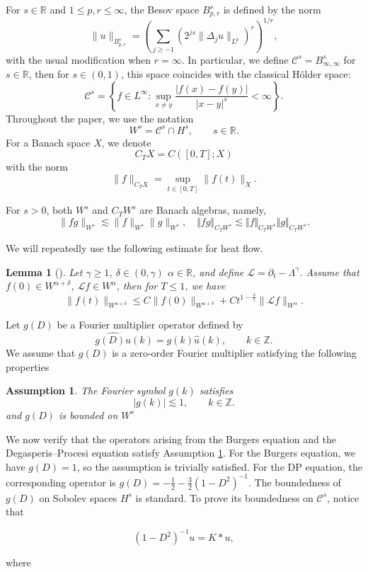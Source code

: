 \documentclass{article}
\newtheorem{lemma}{Lemma}[section]
\newtheorem{assump}{Assumption}[section]
\numberwithin{equation}{section}
\newcommand{\m}{\mathbb}
\newcommand{\ml}{\mathcal}
\begin{document}
For $s\in\mathbb R$ and $1\leq p,r\leq\infty$, the Besov space $B^s_{p,r}$ is defined by the norm
\[
\|u\|_{B^s_{p,r}}
=
\left(
\sum_{j\geq-1}
(2^{js}\|\Delta_j u\|_{L^p})^r
\right)^{1/r},
\]
with the usual modification when $r=\infty$. In particular, we define $\ml C^s=B_{\infty,\infty}^s$ for $s\in\m R$, then for $s\in(0,1)$, this space coincides with the classical Hölder space:
\[
\mathcal C^s
=
\left\{
f\in L^\infty:
\sup_{x\neq y}
\frac{|f(x)-f(y)|}{|x-y|^s}<\infty
\right\}.
\]
Throughout the paper, we use the notation
\[
W^s=\mathcal C^s\cap H^s,
\qquad s\in\mathbb R .
\]
For a Banach space $X$, we denote
\[
C_TX=C([0,T];X)
\]
with the norm
\[
\|f\|_{C_TX}
=
\sup_{t\in[0,T]}\|f(t)\|_X .
\]

For $s>0$, both $W^s$ and $C_TW^s$ are Banach algebras, namely,
\[
\|fg\|_{W^s}\lesssim \|f\|_{W^s}\|g\|_{W^s},\quad \Vert fg\Vert_{C_TW^s}\lesssim \Vert f\Vert_{C_TW^s}\Vert g\Vert_{C_TW^s}.
\]

We will repeatedly use the following estimate for heat flow.

\begin{lemma}[\cite{zhang2025resultsfractionalroughburgers}]
\label{le;est;heat flow}
Let $\gamma\geq1$, $\delta\in(0,\gamma)$ $\alpha\in\mathbb R$, and define $\mathcal L=\partial_t-\Lambda^\gamma$. Assume that $f(0)\in W^{\alpha+\delta} $, $\mathcal Lf\in W^\alpha$, then for $T\leq 1$, we have
\[
\|f(t)\|_{W^{\alpha+\delta}}
\leq
C\|f(0)\|_{W^{\alpha+\delta}}
+
Ct^{1-\frac{\delta}{\gamma}}
\|\mathcal Lf\|_{W^\alpha}.
\]
\end{lemma}
Let $g(D)$ be a Fourier multiplier operator defined by
\[
\widehat{g(D)u}(k)=g(k)\hat u(k),
\qquad k\in\mathbb Z.
\]
We assume that $g(D)$ is a zero-order Fourier multiplier satisfying the following properties
\begin{assump}\label{ass:g}
The Fourier symbol $g(k)$ satisfies
\[
|g(k)|\lesssim 1,\qquad k\in\mathbb Z .
\]
and $g(D)$ is bounded on $W^s$
\end{assump}
We now verify that the operators arising from the Burgers equation and the Degasperis--Procesi equation satisfy Assumption \ref{ass:g}. For the Burgers equation, we have \(g(D)=1\), so the assumption is trivially satisfied. For the DP equation, the corresponding operator is $g(D)=-\frac{1}{2}-\frac{3}{2}(1-D^2)^{-1}.$ The boundedness of \(g(D)\) on Sobolev spaces \(H^s\) is standard. To prove its boundedness on \(\ml C^s\), notice that

$$
(1-D^2)^{-1}u=K*u,
$$

where
\end{document}
